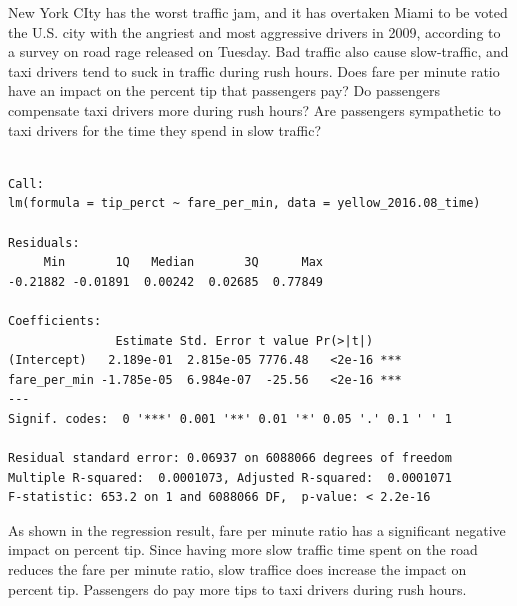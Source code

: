 \documentclass[12pt,twoside]{reedthesis}
\newenvironment{Shaded}{\begin{snugshade}}{\end{snugshade}}
\newcommand{\KeywordTok}[1]{\textcolor[rgb]{0.13,0.29,0.53}{\textbf{#1}}}
\newcommand{\DataTypeTok}[1]{\textcolor[rgb]{0.13,0.29,0.53}{#1}}
\newcommand{\DecValTok}[1]{\textcolor[rgb]{0.00,0.00,0.81}{#1}}
\newcommand{\FloatTok}[1]{\textcolor[rgb]{0.00,0.00,0.81}{#1}}
\newcommand{\StringTok}[1]{\textcolor[rgb]{0.31,0.60,0.02}{#1}}
\newcommand{\CommentTok}[1]{\textcolor[rgb]{0.56,0.35,0.01}{\textit{#1}}}
\newcommand{\OperatorTok}[1]{\textcolor[rgb]{0.81,0.36,0.00}{\textbf{#1}}}
\newcommand{\NormalTok}[1]{#1}
\theoremstyle{definition}
\theoremstyle{definition}
\theoremstyle{definition}
\theoremstyle{remark}
\begin{document}
New York CIty has the worst traffic jam, and it has overtaken Miami to
be voted the U.S. city with the angriest and most aggressive drivers in
2009, according to a survey on road rage released on Tuesday. Bad
traffic also cause slow-traffic, and taxi drivers tend to suck in
traffic during rush hours. Does fare per minute ratio have an impact on
the percent tip that passengers pay? Do passengers compensate taxi
drivers more during rush hours? Are passengers sympathetic to taxi
drivers for the time they spend in slow traffic?
\begin{Shaded}
\end{Shaded}
\begin{verbatim}

Call:
lm(formula = tip_perct ~ fare_per_min, data = yellow_2016.08_time)

Residuals:
     Min       1Q   Median       3Q      Max 
-0.21882 -0.01891  0.00242  0.02685  0.77849 

Coefficients:
               Estimate Std. Error t value Pr(>|t|)    
(Intercept)   2.189e-01  2.815e-05 7776.48   <2e-16 ***
fare_per_min -1.785e-05  6.984e-07  -25.56   <2e-16 ***
---
Signif. codes:  0 '***' 0.001 '**' 0.01 '*' 0.05 '.' 0.1 ' ' 1

Residual standard error: 0.06937 on 6088066 degrees of freedom
Multiple R-squared:  0.0001073, Adjusted R-squared:  0.0001071 
F-statistic: 653.2 on 1 and 6088066 DF,  p-value: < 2.2e-16
\end{verbatim}
As shown in the regression result, fare per minute ratio has a
significant negative impact on percent tip. Since having more slow
traffic time spent on the road reduces the fare per minute ratio, slow
traffice does increase the impact on percent tip. Passengers do pay more
tips to taxi drivers during rush hours.
\end{document}
